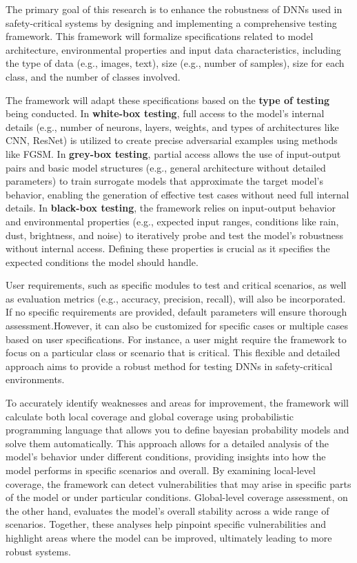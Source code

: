 The primary goal of this research is to enhance the robustness of DNNs used in safety-critical systems by designing and implementing a comprehensive testing framework. This framework will formalize specifications related to model architecture, environmental properties and input data characteristics, including the type of data (e.g., images, text), size (e.g., number of samples), size for each class, and the number of classes involved.

The framework will adapt these specifications based on the \textbf{type of testing} being conducted. In \textbf{white-box testing}, full access to the model's internal details (e.g., number of neurons, layers, weights, and types of architectures like CNN, ResNet) is utilized to create precise adversarial examples using methods like FGSM. In \textbf{grey-box testing}, partial access allows the use of input-output pairs and basic model structures (e.g., general architecture without detailed parameters) to train surrogate models that approximate the target model's behavior, enabling the generation of effective test cases without need full internal details. In \textbf{black-box testing}, the framework relies on input-output behavior and environmental properties (e.g., expected input ranges, conditions like rain, dust, brightness, and noise) to iteratively probe and test the model's robustness without internal access. Defining these properties is crucial as it specifies the expected conditions the model should handle.

User requirements, such as specific modules to test and critical scenarios, as well as evaluation metrics (e.g., accuracy, precision, recall), will also be incorporated. If no specific requirements are provided, default parameters will ensure thorough assessment.However, it can also be customized for specific cases or multiple cases based on user specifications. For instance, a user might require the framework to focus on a particular class or scenario that is critical. This flexible and detailed approach aims to provide a robust method for testing DNNs in safety-critical environments.


To accurately identify weaknesses and areas for improvement, the framework will calculate both local coverage and global coverage using probabilistic programming language that allows you to define bayesian probability models and solve them automatically. This approach allows for a detailed analysis of the model's behavior under different conditions, providing insights into how the model performs in specific scenarios and overall. By examining local-level coverage, the framework can detect vulnerabilities that may arise in specific parts of the model or under particular conditions. Global-level coverage assessment, on the other hand, evaluates the model's overall stability across a wide range of scenarios. Together, these analyses help pinpoint specific vulnerabilities and highlight areas where the model can be improved, ultimately leading to more robust systems.

